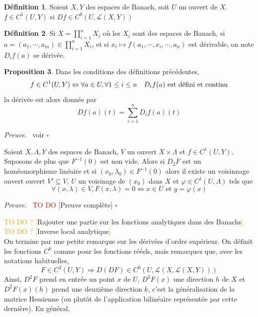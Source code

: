 \documentclass[a4paper,12pt,oneside,titlepage]{article}
\newcommand{\todo}[1]{\textcolor{red}{TO DO [}#1\textcolor{red}{]}}
\newcommand{\todomaybe}[1]{\textcolor{orange}{TO DO ? [}#1\textcolor{orange}{]}}
\theoremstyle{definition}
\newtheorem{definition}{Définition}[section]
\newtheorem{proposition}[definition]{Proposition}
\theoremstyle{plain}
\newenvironment{preuve}
{\par\noindent\textit{Preuve.}\ }
{\hfill$\square$\par}
\begin{document}
\begin{definition}
    Soient $X,Y$ des espaces de Banach, soit $U$ un ouvert de $X$.
    $f\in C^1(U,Y)$ si $Df\in C^0(U,\mathcal{L}(X,Y))$
\end{definition}
\begin{definition}
    Si $X=\prod_{i=1}^n X_i$ où les $X_i$ sont des espaces 
    de Banach, si $a=(a_1,\cdots,a_m)\in\prod_{i=1}^n X_i$,  
    et si $x_i\mapsto f(a_1,\cdots,x_i,\cdots,a_n)$
    est dérivable, on note  $D_{i}f(a)$ se dérivée.
\end{definition}
\begin{proposition}
    Dans les conditions des définitions précédentes, 
    \begin{equation*}
        f\in C^1(U,Y)\Leftrightarrow \forall a\in U, \space
        \forall 1\leq i \leq n \quad  D_i f(a)\text{ est défini et continu}
    \end{equation*}
    la dérivée est alors donnée par
    \begin{equation*}
        Df(a)(t)=\sum_{i=1}^n D_i f(a)(t)
    \end{equation*}
\end{proposition}
\begin{preuve}
    voir \cite{dieudonne1969fma8}
\end{preuve}

\begin{theobox}
Soient $X,\Lambda,Y$ des espaces de Banach, $V$ un ouvert $X\times\Lambda$ et $f\in C^1(U,Y)$. Suposons de plus que $F^{-1}(0)$ est non vide. Alors si $D_2 F$ est un homéomorphisme linéaire et si $(x_0,\lambda_0)\in F^{-1}(0)$ alors il existe un voisinnage ouvert ouvert $V'\subseteq V$, $U$ un voisinage de $(x_0)$ dans $X$ et $\varphi\in C^1(U,\Lambda)$ tels que 
\begin{equation*}
    \forall (x,\lambda)\in V, F(x,\lambda)=0\Leftrightarrow x\in U \text{ et } y=\varphi(x)
\end{equation*}
\end{theobox}
\begin{preuve}
    \todo{Preuve complète}
\end{preuve}


\todomaybe{Rajouter une partie sur les fonctions analytiques dans des Banachs}
\\

\todomaybe{Inverse local analytique}
\\

On termine par une petite remarque sur les dérivées d'ordre supérieur. On définit les fonctions $C^k$ comme pour les fonctions rééels, mais remarquez que, avec les notations habituelles,
\begin{equation*}
    F\in C^2(U,Y)\Rightarrow D(DF)\in C^0(U,\mathcal{L}(X,\mathcal{L}(X,Y)))
\end{equation*}
Ainsi, $D^2F$ prend en entrée un point $x$ de $U$, $D^2F(x)$ une direction $h$ de $X$ et  $D^2F(x)(h)$ prend une deuxième direction $k$, c'est la généralisation de la matrice Hessienne (ou plutôt de l'application bilinéaire représentée par cette dernière). En général, 
\newpage
\end{document}
